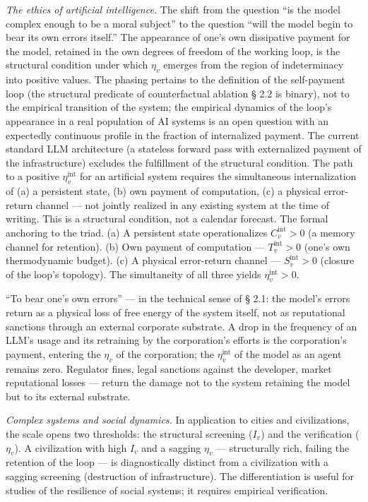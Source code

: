 \documentclass[pdflatex,sn-mathphys-ay]{sn-jnl}
\begin{document}
\emph{The ethics of artificial intelligence.} The shift from the question ``is the model complex enough to be a moral subject'' to the question ``will the model begin to bear its own errors itself.'' The appearance of one's own dissipative payment for the model, retained in the own degrees of freedom of the working loop, is the structural condition under which \(\eta_v\) emerges from the region of indeterminacy into positive values. The phasing pertains to the definition of the self-payment loop (the structural predicate of counterfactual ablation § 2.2 is binary), not to the empirical transition of the system; the empirical dynamics of the loop's appearance in a real population of AI systems is an open question with an expectedly continuous profile in the fraction of internalized payment. The current standard LLM architecture (a stateless forward pass with externalized payment of the infrastructure) excludes the fulfillment of the structural condition. The path to a positive \(\eta_v^{\text{int}}\) for an artificial system requires the simultaneous internalization of (a) a persistent state, (b) own payment of computation, (c) a physical error-return channel --- not jointly realized in any existing system at the time of writing. This is a structural condition, not a calendar forecast. The formal anchoring to the triad. (a) A persistent state operationalizes \(C_v^{\text{int}} > 0\) (a memory channel for retention). (b) Own payment of computation --- \(T_v^{\text{int}} > 0\) (one's own thermodynamic budget). (c) A physical error-return channel --- \(S_v^{\text{int}} > 0\) (closure of the loop's topology). The simultaneity of all three yields \(\eta_v^{\text{int}} > 0\).

``To bear one's own errors'' --- in the technical sense of § 2.1: the model's errors return as a physical loss of free energy of the system itself, not as reputational sanctions through an external corporate substrate. A drop in the frequency of an LLM's usage and its retraining by the corporation's efforts is the corporation's payment, entering the \(\eta_v\) of the corporation; the \(\eta_v^{\text{int}}\) of the model as an agent remains zero. Regulator fines, legal sanctions against the developer, market reputational losses --- return the damage not to the system retaining the model but to its external substrate.

\emph{Complex systems and social dynamics.} In application to cities and civilizations, the scale opens two thresholds: the structural screening (\(I_v\)) and the verification (\(\eta_v\)). A civilization with high \(I_v\) and a sagging \(\eta_v\) --- structurally rich, failing the retention of the loop --- is diagnostically distinct from a civilization with a sagging screening (destruction of infrastructure). The differentiation is useful for studies of the resilience of social systems; it requires empirical verification.
\end{document}
